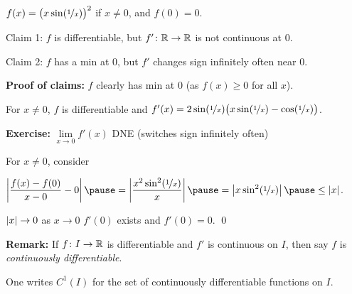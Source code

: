\documentclass[10pt,aspectratio=169]{beamer}
\begin{document}
\begin{frame}

$f(x) = {\bigl( x \sin(\nicefrac{1}{x}) \bigr)}^2$ if $x \not= 0$, and $f(0) = 0$.

\medskip

Claim 1: $f$ is differentiable, but $f' \colon {\mathbb{R}} \to {\mathbb{R}}$ is not continuous at
$0$.

\medskip

Claim 2: $f$ has a min at $0$, but $f'$
changes sign infinitely often near $0$.

\pause
\medskip

\textbf{Proof of claims:}
$f$ clearly has min at $0$ (as $f(x) \geq 0$ for all $x$).

\pause
\medskip

For $x \not= 0$,
$f$ is differentiable
and
$f'(x) = 2 \sin (\nicefrac{1}{x}) \bigl( x \sin (\nicefrac{1}{x}) -
\cos(\nicefrac{1}{x}) \bigr)$.

\pause
\medskip

\textbf{Exercise:} $\lim\limits_{x\to 0} f'(x)$ DNE (switches sign
infinitely often)

\pause
\medskip

For $x \neq 0$, consider

\medskip

\quad
$\displaystyle
\abs{\frac{f(x)-f(0)}{x-0} - 0}
\pause
=
\abs{\frac{x^2 \sin^2(\nicefrac{1}{x})}{x}}
\pause
=
\abs{x \sin^2(\nicefrac{1}{x})}
\pause
\leq
\abs{x}$.

\pause
\medskip

$\left\lvert {x} \right\rvert \to 0$ as $x \to 0$
\pause
\wthus $f'(0)$ exists and $f'(0) = 0$. \qed

\end{frame}

\begin{frame}

\textbf{Remark:}
If $f \colon I \to {\mathbb{R}}$ is differentiable and
$f'$ is continuous on $I$, then say $f$ is
\emph{continuously differentiable}.

\pause
\medskip

One writes $C^1(I)$ for the set of continuously differentiable functions on $I$.

\end{frame}
\end{document}
